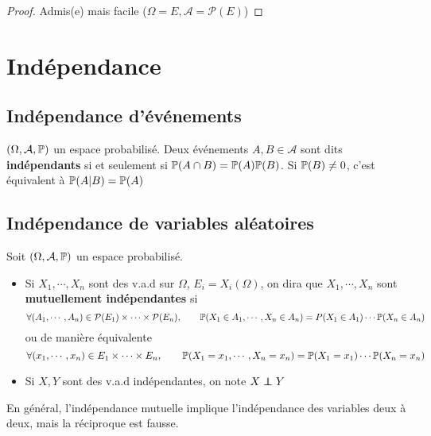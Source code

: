 \begin{proof}
    Admis(e) mais facile ($\Omega=E, \mathcal A=\mathcal P(E)$)
\end{proof}

\section{Indépendance}

\subsection{Indépendance d'événements}

\begin{dfn}
    $(\Omega, \mathcal A, \P)$ un espace probabilisé. Deux événements $A,B\in \mathcal A$ sont dits \textbf{indépendants} si et seulement si $\P(A\cap B)=\P(A)\P(B)$. Si $\P(B)\neq 0$, c'est équivalent à $\P(A|B)=\P(A)$
\end{dfn}

\subsection{Indépendance de variables aléatoires}

\begin{dfn}
    Soit $(\Omega, \mathcal A, \P)$ un espace probabilisé. \begin{itemize}
        \item Si $X_1, \cdots, X_n$ sont des v.a.d sur $\Omega$, $E_i=X_i(\Omega)$, on dira que $X_1, \cdots,X_n$ sont \textbf{mutuellement indépendantes} si \[
                \forall (A_1,\cdots,A_n)\in \mathcal P(E_1)\times \cdots \times \mathcal P(E_n), \qquad \P(X_1\in  A_1,\cdots,X_n\in A_n)=P(X_1\in A_1)\cdots \P(X_n\in A_n)
        \] ou de manière équivalente \[
        \forall (x_1,\cdots,x_n)\in E_1\times \cdots \times E_n, \qquad \P(X_1=x_1,\cdots,X_n=x_n)=\P(X_1=x_1)\cdots \P(X_n=x_n)
        \] 
    \item Si $X, Y$ sont des v.a.d indépendantes, on note $X\indep Y$
    \end{itemize}
\end{dfn}

\begin{rem}
    En général, l'indépendance mutuelle implique l'indépendance des variables deux à deux, mais la réciproque est fausse.
\end{rem}

